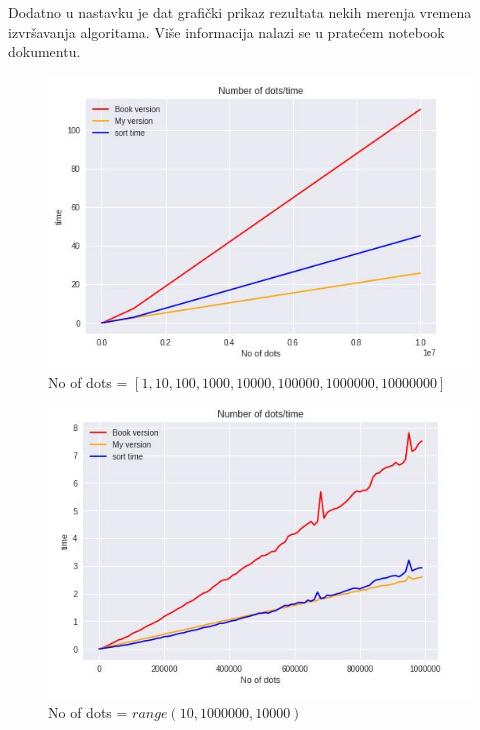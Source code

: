 \documentclass[a4paper]{article}
\begin{document}
Dodatno u nastavku je dat grafički prikaz rezultata nekih merenja vremena izvršavanja algoritama. Više informacija nalazi se u pratećem notebook dokumentu.

\begin{figure}[h!]
\begin{center}
\includegraphics[scale=0.8]{time1.JPG}
\end{center}
\caption{No of dots = $[1, 10, 100, 1000, 10 000, 100 000, 1 000 000, 10 000 000]$}
\label{fig:add}
\end{figure}

\begin{figure}[h!]
\begin{center}
\includegraphics[scale=0.8]{time2.JPG}
\end{center}
\caption{No of dots = $range(10, 1 000 000, 10 000)$}
\label{fig:add}
\end{figure}



\clearpage
{}
\appendix
 

\end{document}
